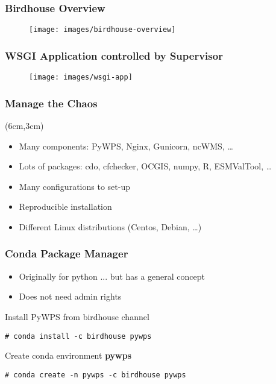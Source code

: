 \documentclass{beamer}
\begin{document}
\begin{frame}
\frametitle<presentation>{Birdhouse Overview}

  \begin{figure}[ht]
    \centering
    \texttt{[image: images/birdhouse-overview]}
  \end{figure}

\end{frame}

\begin{frame}
\frametitle<presentation>{WSGI Application controlled by Supervisor}

  \begin{figure}[ht]
    \centering
    \texttt{[image: images/wsgi-app]}
  \end{figure}

\end{frame}

\begin{frame}
  \frametitle<presentation>{Manage the Chaos}


  \begin{textblock*}{7cm}(6cm,3cm)
  \begin{itemize}
    \item Many components: PyWPS, Nginx, Gunicorn, ncWMS, \ldots
    \item Lots of packages: cdo, cfchecker, OCGIS, numpy, R, ESMValTool, \ldots
    \item Many configurations to set-up
    \item Reproducible installation
    \item Different Linux distributions (Centos, Debian, \ldots)
  \end{itemize}
  \end{textblock*}
\end{frame}

\begin{frame}[fragile]
  \frametitle<presentation>{Conda Package Manager}
  \begin{itemize}
    \item Originally for python ... but has a general concept
    \item Does not need admin rights
  \end{itemize}
  Install PyWPS from birdhouse channel
    \begin{verbatim}
# conda install -c birdhouse pywps
    \end{verbatim}
  Create conda environment \textbf{pywps}
    \begin{verbatim}
# conda create -n pywps -c birdhouse pywps
    \end{verbatim}
\end{frame}
\end{document}
